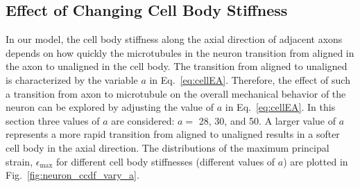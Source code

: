 \documentclass[10pt]{asme2ej}
\begin{document}
\subsection{Effect of Changing Cell Body Stiffness}
In our model, the cell body stiffness along the axial direction of adjacent axons depends on how quickly the microtubules in the neuron transition from aligned in the axon to unaligned in the cell body. The transition from aligned to unaligned is characterized by the variable $a$ in Eq.\ \eqref{eq:cellEA}. Therefore, the effect of such a transition from axon to microtubule on the overall mechanical behavior of the neuron can be explored by adjusting the value of $a$ in Eq.\ \eqref{eq:cellEA}. In this section three values of $a$ are considered: $a=$ 28, 30, and 50. A larger value of $a$ represents a more rapid transition from aligned to unaligned results in a softer cell body in the axial direction. The distributions of the maximum principal strain, $\epsilon_{\text{max}}$ for different cell body stiffnesses (different values of $a$) are plotted in Fig.\ \ref{fig:neuron_ccdf_vary_a}.
%
\end{document}
